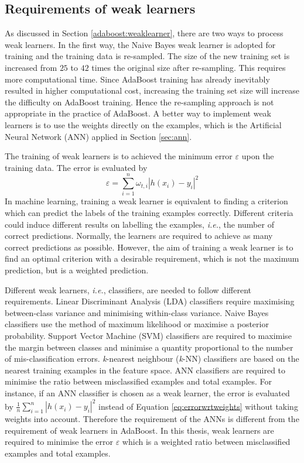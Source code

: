 \subsection{Requirements of weak learners}
As discussed in \mbox{Section} \ref{adaboost:weaklearner}, there are two ways to process weak learners. In the first way, the Naive Bayes weak learner is adopted for training and the training data is re-sampled. The size of the new training set is increased from $25$ to $42$ times the original size after re-sampling. This requires more computational time. Since AdaBoost training has already inevitably resulted in higher computational cost, increasing the training set size will increase the difficulty on AdaBoost training. Hence the re-sampling approach is not appropriate in the practice of AdaBoost. A better way to implement weak learners is to use the weights directly on the examples, which is the Artificial Neural Network (ANN) applied in \mbox{Section} \ref{sec:ann}.

The training of weak learners is to achieved the minimum error $\varepsilon$ upon the training data. The error is evaluated by
\begin{equation}
 \varepsilon=\sum_{i=1}^{n}\omega_{t,i}|h(x_{i})-y_{i}|^{2}
\label{eq:errorwrtweights}
\end{equation}
In machine learning, training a weak learner is equivalent to finding a criterion which can predict the labels of the training examples correctly. Different criteria could induce different results on labelling the examples, \textit{i.e.}, the number of correct predictions. Normally, the learners are required to achieve as many correct predictions as possible. However, the aim of training a weak learner is to find an optimal criterion with a desirable requirement, which is not the maximum prediction, but is a weighted prediction.

Different weak learners, \textit{i.e.}, classifiers, are needed to follow different requirements. Linear Discriminant Analysis (LDA) classifiers require maximising between-class variance and minimising within-class variance. Naive Bayes classifiers use the method of maximum likelihood or maximise a posterior probability. Support Vector Machine (SVM) classifiers are required to maximise the margin between classes and minimise a quantity proportional to the number of mis-classification errors. \textit{k}-nearest neighbour (\textit{k}-NN) classifiers are based on the nearest training examples in the feature space. ANN classifiers are required to minimise the ratio between misclassified examples and total examples. For instance, if an ANN classifier is chosen as a weak learner, the error is evaluated by $\frac{1}{n}\sum_{i=1}^{n}|h(x_{i})-y_{i}|^{2}$ instead of \mbox{Equation} \ref{eq:errorwrtweights} without taking weights into account. Therefore the requirement of the ANNs is different from the requirement of weak learners in AdaBoost. In this thesis, weak learners are required to minimise the error $\varepsilon$ which is a weighted ratio between misclassified examples and total examples.

